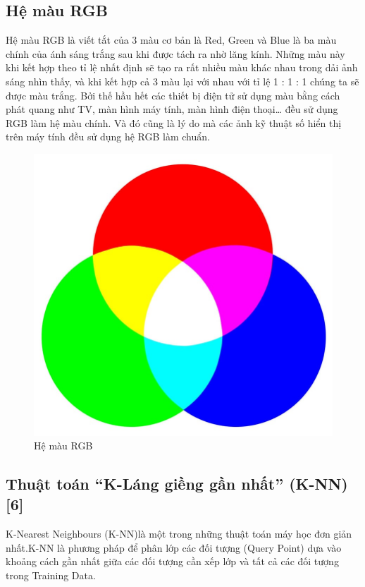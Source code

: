 \documentclass[12pt,a4paper]{article}
\begin{document}
\subsection{Hệ màu RGB}
Hệ màu RGB là viết tắt của 3 màu cơ bản là Red, Green và Blue là ba màu chính của ánh sáng trắng sau khi được tách ra nhờ lăng kính. Những màu này khi kết hợp theo tỉ lệ nhất định sẽ tạo ra rất nhiều màu khác nhau trong dải ảnh sáng nhìn thấy, và khi kết hợp cả 3 màu lại với nhau với tỉ lệ 1 : 1 : 1 chúng ta sẽ được màu trắng. Bởi thế hầu hết các thiết bị điện tử sử dụng màu bằng cách phát quang như TV, màn hình máy tính, màn hình điện thoại… đều sử dụng RGB làm hệ màu chính. Và đó cũng là lý do mà các ảnh kỹ thuật số hiển thị trên máy tính đều sử dụng hệ RGB làm chuẩn.
\begin{center}
    \begin{figure}[htp]
    \begin{center}
    \includegraphics[scale=.1]{Images/RGB}
    \end{center}
    \caption{Hệ màu RGB}
    \end{figure}
\end{center}
\subsection{Thuật toán ``K-Láng giềng gần nhất'' (K-NN) [6]}
K-Nearest Neighbours (K-NN)là một trong những thuật toán máy học đơn giản nhất.K-NN là phương pháp để phân lớp các đối tượng (Query Point) dựa vào khoảng cách gần nhất giữa các đối tượng cần xếp lớp và tất cả các đối tượng trong Training Data.
\end{document}
